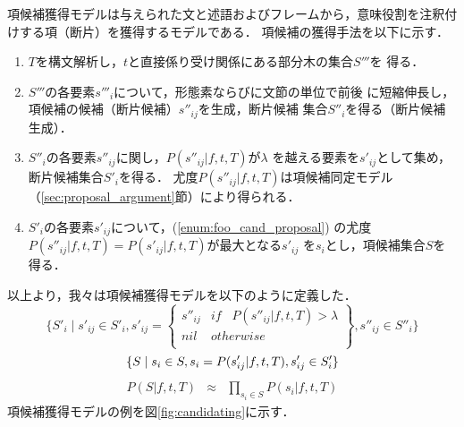 \documentclass[japanese]{jnlp_1.2b}
\begin{document}
項候補獲得モデルは与えられた文と述語およびフレームから，意味役割を注釈付
けする項（断片）を獲得するモデルである．
項候補の獲得手法を以下に示す．
\vspace{6pt} 
\begin{enumerate}
 \item $T$を構文解析し，$t$と直接係り受け関係にある部分木の集合$S'''$を
       得る．
       \label{enum:foo_parse}
 \item $S'''$の各要素$s'''_{i}$について，形態素ならびに文節の単位で前後
       に短縮伸長し，項候補の候補（断片候補）$s''_{ij}$を生成，断片候補
       集合$S''_{i}$を得る（断片候補生成）．
 \item $S''_{i}$の各要素$s''_{ij}$に関し，$P(s''_{ij}|f,t,T)$が$\lambda$
       を越える要素を$s'_{ij}$として集め，断片候補集合$S'_{i}$を得る．
       尤度$P(s''_{ij}|f,t,T)$は項候補同定モデル
       （\ref{sec:proposal_argument}節）により得られる．
       \label{enum:foo_cand_proposal}
 \item $S'_{i}$の各要素$s'_{ij}$について，(\ref{enum:foo_cand_proposal})
       の尤度$P(s''_{ij}|f,t,T) = P(s'_{ij}|f,t,T)$が最大となる$s'_{ij}$
       を$s_{i}$とし，項候補集合$S$を得る．
\end{enumerate}
以上より，我々は項候補獲得モデルを以下のように定義した．
\begin{equation}
 \label{eqn:candidating0_proposal}
  \{ S'_{i} \; | \; s'_{ij} \in S'_{i},
  s'_{ij} = \left\{
	     \begin{array}{ll}
	      s''_{ij} & if \;\;\; P(s''_{ij}|f,t,T) > \lambda \\
	      nil      & otherwise \\
	     \end{array}
	    \right\}
  , s''_{ij} \in S''_{i} \}
\end{equation}
\begin{equation}
 \label{eqn:candidating1_proposal}
  \{ S \; | \; s_{i} \in S, s_{i} = \argmax{s'_{ij}}{P(s'_{ij}|f,t,T)},
  s'_{ij} \in S'_{i} \}
\end{equation}
\begin{eqnarray}
 \label{eqn:candidating2_proposal}
  P(S|f,t,T) & \approx & \prod_{s_{i} \in S}{P(s_{i}|f,t,T)}
\end{eqnarray}
項候補獲得モデルの例を図\ref{fig:candidating}に示す．
\end{document}
